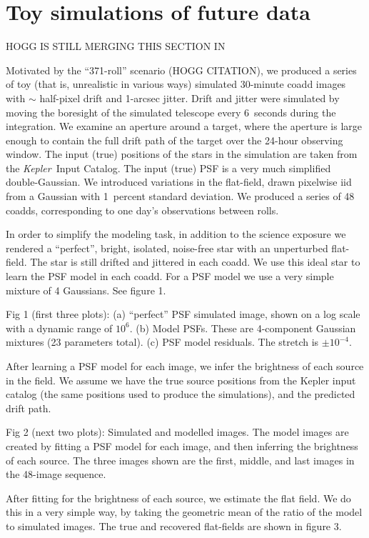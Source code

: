\documentclass[letterpaper,12pt,preprint]{aastex}
\newcommand{\observatory}[1]{\textsl{#1}}
\newcommand{\Kepler}{\observatory{Kepler}}
\begin{document}
\section{Toy simulations of future data}\label{sec:future}

HOGG IS STILL MERGING THIS SECTION IN

Motivated by the ``371-roll'' scenario (HOGG CITATION),
  we produced a series of toy (that is, unrealistic in various ways)
  simulated 30-minute coadd images with $\sim$ half-pixel drift and 1-arcsec jitter.
Drift and jitter were simulated by moving the boresight of the simulated telescope
  every 6~seconds during the integration.
We examine an aperture around a target,
  where the aperture is large enough to contain the full drift path
  of the target over the 24-hour observing window.
The input (true) positions of the stars in the simulation are
  taken from the \Kepler\ Input Catalog.
The input (true) PSF is a very much simplified double-Gaussian.
We introduced variations in the flat-field,
   drawn pixelwise iid from a Gaussian with 1~percent standard deviation.
We produced a series of 48 coadds,
   corresponding to one day's observations between rolls.

In order to simplify the modeling task, in addition to the science exposure we rendered a ``perfect'', bright, isolated, noise-free star with an unperturbed flat-field.  The star is still drifted and jittered in each coadd.  We use this ideal star to learn the PSF model in each coadd.  For a PSF model we use a very simple mixture of 4 Gaussians.  See figure 1.

Fig 1 (first three plots): (a) ``perfect'' PSF simulated image, shown on a log scale with a dynamic range of $10^6$. (b) Model PSFs.  These are 4-component Gaussian mixtures (23 parameters total).  (c) PSF model residuals.  The stretch is $\pm 10^{-4}$.

After learning a PSF model for each image, we infer the brightness of each source in the field.  We assume we have the true source positions from the Kepler input catalog (the same positions used to produce the simulations), and the predicted drift path.

Fig 2 (next two plots): Simulated and modelled images.  The model images are created by fitting a PSF model for each image, and then inferring the brightness of each source.  The three images shown are the first, middle, and last images in the 48-image sequence.

After fitting for the brightness of each source, we estimate the flat field.  We do this in a very simple way, by taking the geometric mean of the ratio of the model to simulated images.  The true and recovered flat-fields are shown in figure 3.
\end{document}
